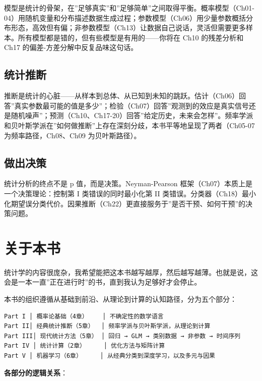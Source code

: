 \documentclass[
]{book}
\begin{document}
模型是统计的骨架，在''足够真实''和''足够简单''之间取得平衡。概率模型（Ch01-04）用随机变量和分布描述数据生成过程；参数模型（Ch06）用少量参数概括分布形态，高效但有偏；非参数模型（Ch13）让数据自己说话，灵活但需要更多样本。所有模型都是错的，但有些模型是有用的------你将在 Ch10 的残差分析和 Ch17 的偏差-方差分解中反复品味这句话。

\subsection{统计推断}\label{ux7edfux8ba1ux63a8ux65ad}

推断是统计的心脏------从样本到总体、从已知到未知的跳跃。估计（Ch06）回答''真实参数最可能的值是多少''；检验（Ch07）回答''观测到的效应是真实信号还是随机噪声''；预测（Ch10、Ch17-20）回答''给定历史，未来会怎样''。频率学派和贝叶斯学派在''如何做推断''上存在深刻分歧，本书平等地呈现了两者（Ch05-07 为频率路径，Ch08、Ch09 为贝叶斯路径）。

\subsection{做出决策}\label{ux505aux51faux51b3ux7b56}

统计分析的终点不是 p 值，而是决策。Neyman-Pearson 框架（Ch07）本质上是一个决策理论：控制第 I 类错误的同时最小化第 II 类错误。分类器（Ch18）最小化期望误分类代价。因果推断（Ch22）更直接服务于''是否干预、如何干预''的决策问题。

\section{关于本书}\label{ux5173ux4e8eux672cux4e66}

统计学的内容很庞杂，我希望能把这本书越写越厚，然后越写越薄。也就是说，这会是一本一直''正在进行时''的书，直到我认为足够好才会停止。

本书的组织遵循从基础到前沿、从理论到计算的认知路径，分为五个部分：

\begin{verbatim}
Part I │ 概率论基础（4章）    │ 不确定性的数学语言
Part II│ 经典统计推断（5章）  │ 频率学派与贝叶斯学派，从理论到计算
Part III│ 现代统计方法（5章） │ 回归 → GLM → 类别数据 → 非参数 → 时间序列
Part IV │ 统计计算（2章）     │ 优化方法与矩阵计算
Part V │ 机器学习（6章）     │ 从经典分类到深度学习，以及多元与因果
\end{verbatim}

\textbf{各部分的逻辑关系}：
\end{document}
